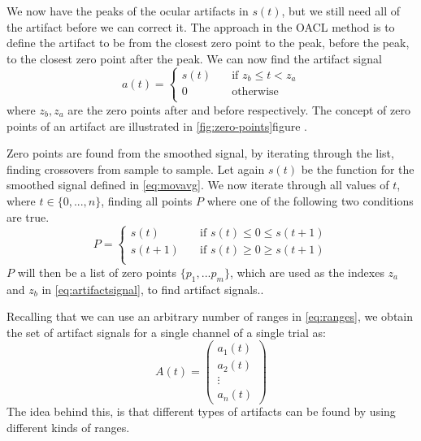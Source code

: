 We now have the peaks of the ocular artifacts in $s(t)$, but we still need all of the artifact before we can correct it. The approach in the OACL method is to define the artifact to be from the closest zero point to the peak, before the peak, to the closest zero point after the peak. We can now find the artifact signal 
\begin{equation}
\label{eq:artifactsignal}
a(t) =
\begin{cases}
s(t)      & \quad \text{if } z_b \leq t < z_a\\
0  & \quad \text{otherwise}\\
\end{cases}
\end{equation}
where $z_b, z_a$ are the zero points after and before respectively. The concept of zero points of an artifact are illustrated in \cref{fig:zero-points}figure .

Zero points are found from the smoothed signal, by iterating through the list, finding crossovers from sample to sample. 
Let again $s(t)$ be the function for the smoothed signal defined in \cref{eq:movavg}. We now iterate through all values of $t$, where $t \in \{0,...,n\}$, finding all points $P$ where one of the following two conditions are true.
\begin{equation}
\label{eq:zero_points}
P =
\begin{cases}
s(t)      & \quad \text{if } s(t) \leq 0 \leq s(t + 1)\\
s(t + 1)  & \quad \text{if } s(t) \geq 0 \geq s(t + 1)\\
\end{cases}
\end{equation}
$P$ will then be a list of zero points $\{p_1,...p_m\}$, which are used as the indexes $z_a$ and $z_b$ in \cref{eq:artifactsignal}, to find artifact signals..

Recalling that we can use an arbitrary number of ranges in \cref{eq:ranges}, we obtain the set of artifact signals for a single channel of a single trial as:
\begin{equation}\label{eq:artifact-signals}
A(t)=  \begin{pmatrix}
a_1(t) \\
a_2(t) \\
\vdots  \\
a_n(t) 
\end{pmatrix}
\end{equation}
The idea behind this, is that different types of artifacts can be found by using different kinds of ranges. 
